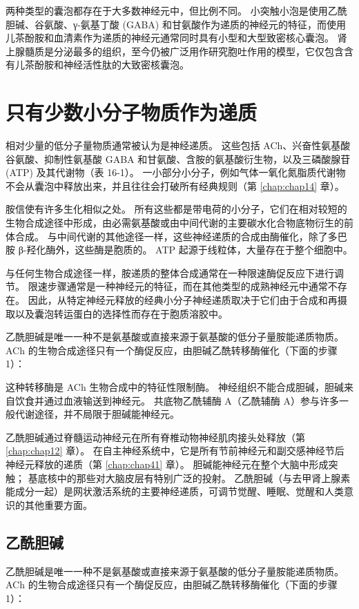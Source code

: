 两种类型的囊泡都存在于大多数神经元中，但比例不同。 
小突触小泡是使用乙酰胆碱、谷氨酸、γ-氨基丁酸 (GABA) 和甘氨酸作为递质的神经元的特征，而使用儿茶酚胺和血清素作为递质的神经元通常同时具有小型和大型致密核心囊泡。 
肾上腺髓质是分泌最多的组织，至今仍被广泛用作研究胞吐作用的模型，它仅包含含有儿茶酚胺和神经活性肽的大致密核囊泡。



\section{只有少数小分子物质作为递质}
相对少量的低分子量物质通常被认为是神经递质。 
这些包括 ACh、兴奋性氨基酸谷氨酸、抑制性氨基酸 GABA 和甘氨酸、含胺的氨基酸衍生物，以及三磷酸腺苷 (ATP) 及其代谢物（表 16-1）。 
一小部分小分子，例如气体一氧化氮脂质代谢物不会从囊泡中释放出来，并且往往会打破所有经典规则（第 \ref{chap:chap14} 章）。


胺信使有许多生化相似之处。 
所有这些都是带电荷的小分子，它们在相对较短的生物合成途径中形成，由必需氨基酸或由中间代谢的主要碳水化合物底物衍生的前体合成。 
与中间代谢的其他途径一样，这些神经递质的合成由酶催化，除了多巴胺 β-羟化酶外，这些酶是胞质的。 
ATP 起源于线粒体，大量存在于整个细胞中。


与任何生物合成途径一样，胺递质的整体合成通常在一种限速酶促反应下进行调节。 
限速步骤通常是一种神经元的特征，而在其他类型的成熟神经元中通常不存在。 
因此，从特定神经元释放的经典小分子神经递质取决于它们由于合成和再摄取以及囊泡转运蛋白的选择性而存在于胞质溶胶中。


乙酰胆碱是唯一一种不是氨基酸或直接来源于氨基酸的低分子量胺能递质物质。 
ACh 的生物合成途径只有一个酶促反应，由胆碱乙酰转移酶催化（下面的步骤 1）：


这种转移酶是 ACh 生物合成中的特征性限制酶。 
神经组织不能合成胆碱，胆碱来自饮食并通过血液输送到神经元。 
共底物乙酰辅酶 A（乙酰辅酶 A）参与许多一般代谢途径，并不局限于胆碱能神经元。


乙酰胆碱通过脊髓运动神经元在所有脊椎动物神经肌肉接头处释放（第 \ref{chap:chap12} 章）。 
在自主神经系统中，它是所有节前神经元和副交感神经节后神经元释放的递质（第 \ref{chap:chap41} 章）。 
胆碱能神经元在整个大脑中形成突触； 基底核中的那些对大脑皮层有特别广泛的投射。 
乙酰胆碱（与去甲肾上腺素能成分一起）是网状激活系统的主要神经递质，可调节觉醒、睡眠、觉醒和人类意识的其他重要方面。



\subsection{乙酰胆碱}
乙酰胆碱是唯一一种不是氨基酸或直接来源于氨基酸的低分子量胺能递质物质。 
ACh 的生物合成途径只有一个酶促反应，由胆碱乙酰转移酶催化（下面的步骤 1）：



